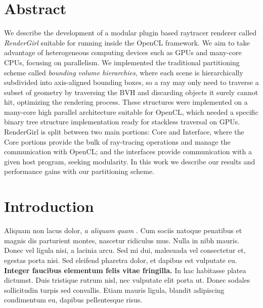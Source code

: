 \documentclass[a0,portrait]{a0poster}
\begin{document}
\begin{multicols}{2} %



\color{Navy} %

\section*{Abstract}
\large

We describe the development of a modular plugin based raytracer
renderer called \emph{RenderGirl} suitable for running inside the
OpenCL framework. We aim to take advantage of heterogeneous computing
devices such as GPUs and many-core CPUs, focusing on parallelism. We
implemented the traditional partitioning scheme called \emph{bounding
  volume hierarchies}, where each scene is hierarchically subdivided
into axis-aligned bounding boxes, so a ray may only need to traverse a
subset of geometry by traversing the BVH and discarding objects it
surely cannot hit, optimizing the rendering process. These structures
were implemented on a many-core high parallel architecture suitable
for OpenCL, which needed a specific binary tree structure
implementation ready for stackless traversal on GPUs. RenderGirl is
split between two main portions: Core and Interface, where the Core
portions provide the bulk of ray-tracing operations and manage the
communication with OpenCL; and the interfaces provide communication
with a given host program, seeking modularity. In this work we
describe our results and performance gains with our partitioning
scheme.


\color{SaddleBrown} %
\large
\section*{Introduction}

Aliquam non lacus dolor, \textit{a aliquam quam}
\cite{Smith:2012qr}. Cum sociis natoque penatibus et magnis dis
parturient montes, nascetur ridiculus mus. Nulla in nibh mauris. Donec
vel ligula nisi, a lacinia arcu. Sed mi dui, malesuada vel consectetur
et, egestas porta nisi. Sed eleifend pharetra dolor, et dapibus est
vulputate eu. \textbf{Integer faucibus elementum felis vitae
  fringilla.} In hac habitasse platea dictumst. Duis tristique rutrum
nisl, nec vulputate elit porta ut. Donec sodales sollicitudin turpis
sed convallis. Etiam mauris ligula, blandit adipiscing condimentum eu,
dapibus pellentesque risus.


\end{multicols}
\end{document}
